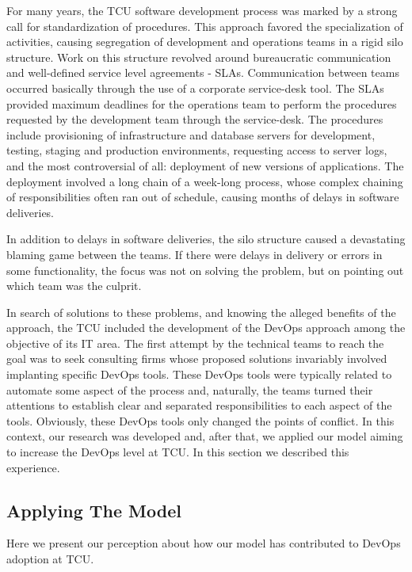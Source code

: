 {
\color{blue}
For many years, the TCU software development process was marked by a strong call
for standardization of procedures. This approach favored the specialization of
activities, causing segregation of development and operations teams in a rigid
silo structure. Work on this structure revolved around bureaucratic
communication and well-defined service level agreements - SLAs. Communication
between teams occurred basically through the use of a corporate service-desk tool.
The SLAs provided maximum deadlines for the operations team to perform the
procedures requested by the development team through the service-desk. The
procedures include provisioning of infrastructure and database servers for
development, testing, staging and production environments, requesting access
to server logs, and the most controversial of all: deployment of new versions
of applications. The deployment involved a long chain of a week-long process,
whose complex chaining of responsibilities often ran out of schedule, causing
months of delays in software deliveries.

In addition to delays in software deliveries, the silo structure caused a
devastating blaming game between the teams. If there were delays in delivery
or errors in some functionality, the focus was not on solving the problem, but
on pointing out which team was the culprit.

In search of solutions to these problems, and knowing the alleged benefits of
the approach, the TCU included the development of the DevOps approach among the
objective of its IT area. The first attempt by the technical teams to reach the
goal was to seek consulting firms whose proposed solutions invariably involved
implanting specific DevOps tools. These DevOps tools were typically related to
automate some aspect of the process and, naturally, the teams turned their
attentions to establish clear and separated responsibilities to each aspect of
the tools. Obviously, these DevOps tools only changed the points of conflict.
In this context, our research was developed and, after that, we applied our
model aiming to increase the DevOps level at TCU. In this section we described
this experience.
}

\subsection{Applying The Model}

Here we present our perception about how our model has contributed to DevOps
adoption at TCU.

